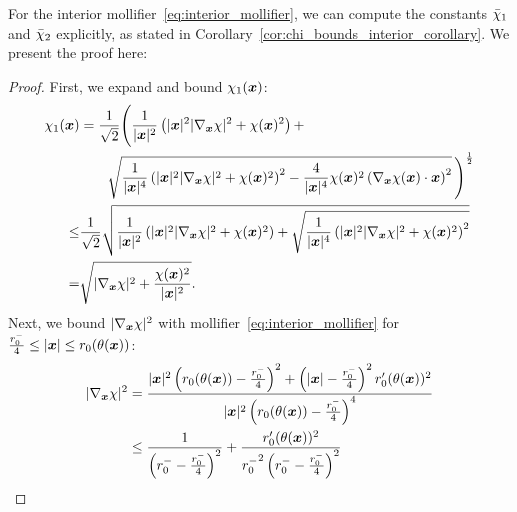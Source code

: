 For the interior mollifier~\eqref{eq:interior_mollifier}, we can compute the constants $\bar{\chi}_1$ and $\bar{\chi}_2$ explicitly, as stated in Corollary~\ref{cor:chi_bounds_interior_corollary}.
We present the proof here:
\begin{proof}
    First, we expand and bound $\chi_1({{\bm{x}}})$:
    \begin{align}
        \chi_1({{\bm{x}}}) &= \frac{1}{\sqrt{2}}\Bigg(  \frac{1}{|{{\bm{x}}}|^2}\left( |{{\bm{x}}}|^2  |\nabla_{{{\bm{x}}}} \chi|^2  +\chi({{\bm{x}}})^2   \right) + \\&\qquad\sqrt{\frac{1}{|{{\bm{x}}}|^4}\left( |{{\bm{x}}}|^2  |\nabla_{{{\bm{x}}}} \chi|^2  +\chi({{\bm{x}}})^2   \right)^2-\frac{4}{|{{\bm{x}}}|^4} \chi({{\bm{x}}})^2 \left( \nabla_{{{\bm{x}}}}\chi({{\bm{x}}})\cdot {{\bm{x}}} \right) ^2} \, \Bigg)^\frac{1}{2} \nonumber\\
        \leq& \frac{1}{\sqrt{2}}\sqrt{   \frac{1}{|{{\bm{x}}}|^2}\left( |{{\bm{x}}}|^2  |\nabla_{{{\bm{x}}}} \chi|^2  +\chi({{\bm{x}}})^2   \right) + \sqrt{\frac{1}{|{{\bm{x}}}|^4}\left( |{{\bm{x}}}|^2  |\nabla_{{{\bm{x}}}} \chi|^2  +\chi({{\bm{x}}})^2   \right)^2}  }\nonumber\\
        =&  \sqrt{|\nabla_{{{\bm{x}}}} \chi|^2  +\frac{\chi({{\bm{x}}})^2}{|{{\bm{x}}}|^2}     }.\label{eq:singularvaluebound}
    \end{align}
    Next, we bound $|\nabla_{{{\bm{x}}}} \chi|^2$ with mollifier~\eqref{eq:interior_mollifier} for $\frac{r_0^-}{4} \leq |{{\bm{x}}}| \leq r_0(\theta({{\bm{x}}}))$:
    \begin{align}
        |\nabla_{\x} \chi|^2 %
        &=\frac{|\x|^2\left(r_0(\theta(\x))-\a\right)^2 +\left( |\x|-\a    \right)^2  r_0'(\theta(\x)) ^2    }{|\x|^2\left(r_0(\theta(\x))-\a\right)^4}\nonumber\\
        &\leq \frac{1}{\left(r_0^- -\a\right)^2} + \frac{  r_0'(\theta(\x)) ^2    }{{r_0^-}^2\left(r_0^--\a\right)^2}\nonumber\\

\end{align}
\end{proof}
